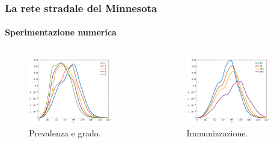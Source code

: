 \documentclass{beamer}
\theoremstyle{definition}
\theoremstyle{plain}
\begin{document}
\begin{frame}
\frametitle{La rete stradale del Minnesota}
\framesubtitle{Sperimentazione numerica}
\begin{columns}
\begin{column}{0.5\textwidth} 
 \begin{figure}
\centering
\includegraphics[width=0.85\textwidth]{Figure/minnesota_prevalenza}
\caption{Prevalenza e grado.}
\end{figure}
\end{column}
\begin{column}{0.5\textwidth}
\pause
 \begin{figure}
\centering
\includegraphics[width=0.85\textwidth]{Figure/minnesota_immunizzazione}
\caption{Immunizzazione.}
\end{figure}
\end{column}
\end{columns}
\end{frame}
\end{document}
